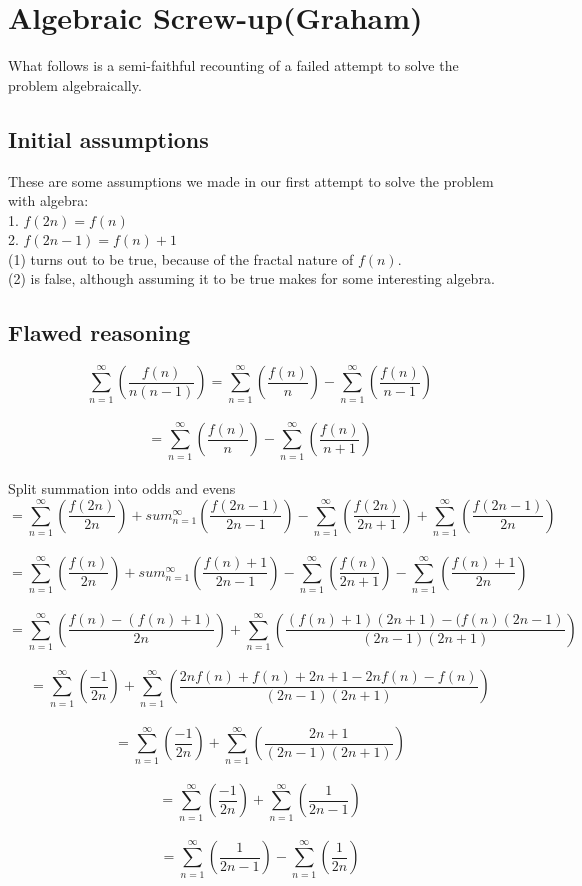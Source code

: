 \documentclass{article}
\begin{document}

\section{Algebraic Screw-up(Graham)}
What follows is a semi-faithful recounting of a failed attempt to solve the problem algebraically.
\subsection{Initial assumptions}
These are some assumptions we made in our first attempt to solve the problem with algebra:\\
1. $f(2n) = f(n)$\\
2. $f(2n-1) = f(n) + 1$\\

(1) turns out to be true, because of the fractal nature of $f(n)$.\\
(2) is false, although assuming it to be true makes for some interesting algebra.\\

\subsection{Flawed reasoning}
$$\sum_{n=1}^\infty \left( \frac{f(n)}{n(n-1)} \right)=\sum_{n=1}^\infty \left( \frac{f(n)}{n} \right)-\sum_{n=1}^\infty \left( \frac{f(n)}{n-1} \right)$$\\
$$=\sum_{n=1}^\infty \left( \frac{f(n)}{n} \right)-\sum_{n=1}^\infty \left( \frac{f(n)}{n+1} \right)$$\\
Split summation into odds and evens
$$=\sum_{n=1}^\infty \left( \frac{f(2n)}{2n} \right)+sum_{n=1}^\infty \left( \frac{f(2n-1)}{2n-1} \right)
-\sum_{n=1}^\infty \left( \frac{f(2n)}{2n+1} \right)+\sum_{n=1}^\infty \left( \frac{f(2n-1)}{2n} \right)$$\\
$$=\sum_{n=1}^\infty \left( \frac{f(n)}{2n} \right)+sum_{n=1}^\infty \left( \frac{f(n)+1}{2n-1} \right)
-\sum_{n=1}^\infty \left( \frac{f(n)}{2n+1} \right)-\sum_{n=1}^\infty \left( \frac{f(n)+1}{2n} \right)$$\\
$$=\sum_{n=1}^\infty \left( \frac{f(n)-(f(n)+1)}{2n} \right)
+\sum_{n=1}^\infty \left( \frac{(f(n)+1)(2n+1)-(f(n)(2n-1)}{(2n-1)(2n+1)} \right)$$\\
$$=\sum_{n=1}^\infty \left( \frac{-1}{2n} \right)
+\sum_{n=1}^\infty \left( \frac{2nf(n)+f(n)+2n+1-2nf(n)-f(n)}{(2n-1)(2n+1)} \right)$$\\
$$=\sum_{n=1}^\infty \left( \frac{-1}{2n} \right)
+\sum_{n=1}^\infty \left( \frac{2n+1}{(2n-1)(2n+1)} \right)$$\\
$$=\sum_{n=1}^\infty \left( \frac{-1}{2n} \right)
+\sum_{n=1}^\infty \left( \frac{1}{2n-1} \right)$$\\
$$=\sum_{n=1}^\infty \left( \frac{1}{2n-1} \right)
-\sum_{n=1}^\infty \left( \frac{1}{2n} \right)$$\\
\end{document}
